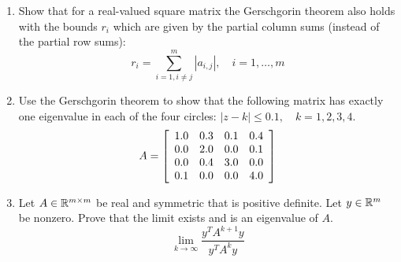 \documentclass{article}
\begin{document}
\begin{enumerate}
\begin{proof}
    \[
        \det(M_1 - \lambda \I) = \det(AB - \lambda \I)\det(-\lambda \I)
    \]
    \[
        \det(M_2 - \lambda \I) = \det(-\lambda \I)\det(BA - \lambda \I)
    \]
    Notice that if $\lambda$ is an eigenvalue of its respective matrix then this determinant product must be equal to zero. We then take the case of each determinant can be zero. For $M_1$ we have that its eigenvalues are either zero, or the eigenvalues of $AB$ by definition. 
    \[
        \det(M_1 - \lambda \I) = 0, \quad \det(AB - \lambda \I) = 0,\quad  \det(-\lambda \I) = -\lambda = 0
    \]
    Similarly we have that the eigenvalues for $M_2$ are either zero or the eigenvalues of $BA$. Notice from a different homework problem (hw2), we have that the matrix products $AB$ and $BA$ have the same eigenvalues. This is because, 
    \[
        ABv = \lambda v, \quad Bv = y, \implies \quad BAy = \lambda y
    \]
    Finally both $M_1$ and $M_2$ have eigenvalues of zero and the eigenvalues of $AB/BA$. 
    
\end{proof}


\item %
Show that for a real-valued square matrix the Gerschgorin theorem also holds with the bounds $r_i$ which are given by the partial column sums (instead of the partial row sums):
\[
    r_i = \sum_{i=1, i\neq j}^m |a_{i,j}|, \quad i = 1, \dots, m
\]


\item  %
Use the Gerschgorin theorem to show that the following matrix has exactly one eigenvalue in each of the four circles: $|z - k| \le 0.1, \quad k = 1, 2, 3, 4$. 
\[
    A = \left[\begin{array}{c c c c} 1.0 & 0.3 & 0.1 & 0.4 \\
                                    0.0 & 2.0 & 0.0 & 0.1 \\
                                    0.0 & 0.4 & 3.0 & 0.0 \\
                                    0.1 & 0.0 & 0.0 & 4.0 \end{array}\right]
\]


\item %
Let $A \in \mathbb{R}^{m \times m}$ be real and symmetric that is positive definite. Let $y \in \mathbb{R}^m$ be nonzero. Prove that the limit exists and is an eigenvalue of $A$.
\[
    \lim_{k \to \infty} \frac{y^TA^{k+1}y}{y^TA^ky}
\]


\end{enumerate}
\end{document}
